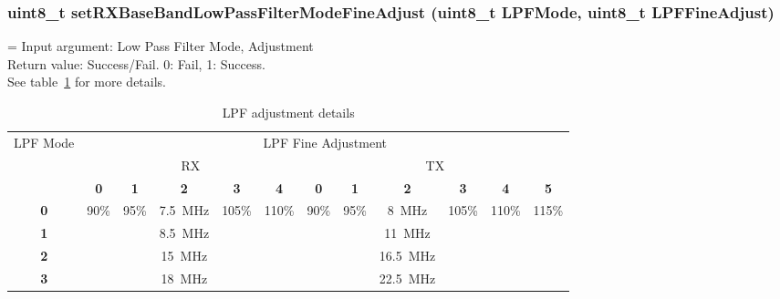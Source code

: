 \subsubsection{uint8\_t setRXBaseBandLowPassFilterModeFineAdjust (uint8\_t LPFMode, uint8\_t LPFFineAdjust)}
\hangindent=\parindent
{}
Input argument: Low Pass Filter Mode, Adjustment\\
Return value: Success/Fail. 0: Fail, 1: Success.\\
See table~\ref{tab:lpf} for more details.

\begin{table}[h]
\centering
	\begin{tabular}{|c|c|c|c|c|c|c|c|c|c|c|c|}
	\hline
	\multirow{3}{*}{LPF Mode} &
	\multicolumn{11}{c|}{LPF Fine Adjustment}\\ \cline{2-12}
	& \multicolumn{5}{c|}{RX} &
	\multicolumn{6}{c|}{TX} \\ \cline{2-12}
			& {\bf 0} & {\bf 1} & {\bf 2} & {\bf 3} & {\bf 4} & {\bf 0} & {\bf 1} & {\bf 2} & {\bf 3} & {\bf 4} & {\bf 5}\\ \hline
	{\bf 0} & \multirow{4}{*}{90\%} & \multirow{4}{*}{95\%} & 7.5~MHz & \multirow{4}{*}{105\%} & \multirow{4}{*}{110\%} 
			& \multirow{4}{*}{90\%} & \multirow{4}{*}{95\%} & 8~MHz   & \multirow{4}{*}{105\%} & \multirow{4}{*}{110\%} & \multirow{4}{*}{115\%}\\ \cline{1-1}\cline{4-4}\cline{9-9}
	{\bf 1} &  &  & 8.5~MHz &  &  &  &  & 11~MHz	&  &  & \\ \cline{1-1}\cline{4-4}\cline{9-9}
	{\bf 2} &  &  & 15~MHz 	&  &  &  &  & 16.5~MHz	&  &  & \\ \cline{1-1}\cline{4-4}\cline{9-9}
	{\bf 3} &  &  & 18~MHz 	&  &  &  &  & 22.5~MHz	&  &  & \\ \hline
	\end{tabular}
	\caption{LPF adjustment details}
	\label{tab:lpf}
\end{table}

